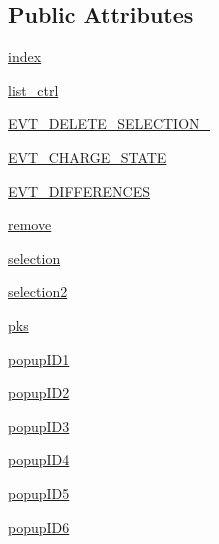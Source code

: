 \subsection*{Public Attributes}
\begin{DoxyCompactItemize}
\item 
\hyperlink{class_uni_dec_1_1unidec__modules_1_1peaklistsort_1_1_peak_list_ctrl_panel_ab0a9573daaeaaa1cb4d0480bc9c0ddf0}{index}
\item 
\hyperlink{class_uni_dec_1_1unidec__modules_1_1peaklistsort_1_1_peak_list_ctrl_panel_a997f2cd571bdb3caddb5bc3e1ca826bd}{list\+\_\+ctrl}
\item 
\hyperlink{class_uni_dec_1_1unidec__modules_1_1peaklistsort_1_1_peak_list_ctrl_panel_a95ab9452d416d38490c36d9ff8ea00bd}{E\+V\+T\+\_\+\+D\+E\+L\+E\+T\+E\+\_\+\+S\+E\+L\+E\+C\+T\+I\+O\+N\+\_}
\item 
\hyperlink{class_uni_dec_1_1unidec__modules_1_1peaklistsort_1_1_peak_list_ctrl_panel_a6b7733dcc30e5593b8251a3ce92e1e73}{E\+V\+T\+\_\+\+C\+H\+A\+R\+G\+E\+\_\+\+S\+T\+A\+T\+E}
\item 
\hyperlink{class_uni_dec_1_1unidec__modules_1_1peaklistsort_1_1_peak_list_ctrl_panel_a848d17f05fe74f426d6edcd180b0f44c}{E\+V\+T\+\_\+\+D\+I\+F\+F\+E\+R\+E\+N\+C\+E\+S}
\item 
\hyperlink{class_uni_dec_1_1unidec__modules_1_1peaklistsort_1_1_peak_list_ctrl_panel_ad0d4244e7aac9b1b2b17b5e26de99c07}{remove}
\item 
\hyperlink{class_uni_dec_1_1unidec__modules_1_1peaklistsort_1_1_peak_list_ctrl_panel_a037ad44ca7e1c348a9f18aa1444385fc}{selection}
\item 
\hyperlink{class_uni_dec_1_1unidec__modules_1_1peaklistsort_1_1_peak_list_ctrl_panel_ac3f08415b21e9d9cfb142875dda71685}{selection2}
\item 
\hyperlink{class_uni_dec_1_1unidec__modules_1_1peaklistsort_1_1_peak_list_ctrl_panel_ada9e77d0b24553db29e4140375ed0e17}{pks}
\item 
\hyperlink{class_uni_dec_1_1unidec__modules_1_1peaklistsort_1_1_peak_list_ctrl_panel_a67be2b421e607749d8ec455c9983c3d6}{popup\+I\+D1}
\item 
\hyperlink{class_uni_dec_1_1unidec__modules_1_1peaklistsort_1_1_peak_list_ctrl_panel_a62901fb7ab029bf53d5d136722101a85}{popup\+I\+D2}
\item 
\hyperlink{class_uni_dec_1_1unidec__modules_1_1peaklistsort_1_1_peak_list_ctrl_panel_a2105129d00be5a2b00c4fc46852fe39f}{popup\+I\+D3}
\item 
\hyperlink{class_uni_dec_1_1unidec__modules_1_1peaklistsort_1_1_peak_list_ctrl_panel_a86c3707c7ca51f1da890e0eb36a2eafc}{popup\+I\+D4}
\item 
\hyperlink{class_uni_dec_1_1unidec__modules_1_1peaklistsort_1_1_peak_list_ctrl_panel_a03762da3ef531481ec83b513eacc8e12}{popup\+I\+D5}
\item 
\hyperlink{class_uni_dec_1_1unidec__modules_1_1peaklistsort_1_1_peak_list_ctrl_panel_aadb9fd50674c37492afc7a748a095126}{popup\+I\+D6}
\end{DoxyCompactItemize}


